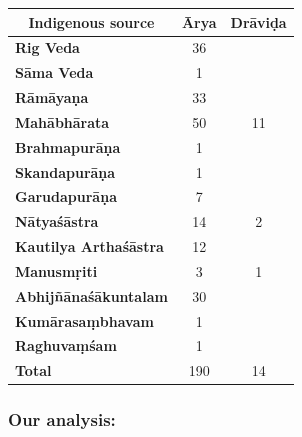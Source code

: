 \begin{table}[!htbp]
\caption{204 occurences of \textit{Ārya} and \textit{Drāviḍa} from 13 different sources}\label{art3-tab1}
\begin{longtable}{@{}|l|c|c|@{}}
\hline
\multicolumn{1}{|c|}{\textbf{Indigenous source}} & \multicolumn{1}{c|}{\textbf{Ārya}} & \multicolumn{1}{c|}{\textbf{Drāviḍa}} \\
\hline
\textbf{Rig Veda} & 36 &  \\
\hline
\textbf{Sāma Veda} & 1 &  \\
\hline
\textbf{Rāmāyaṇa} & 33 &  \\
\hline
\textbf{Mahābhārata} & 50 & 11 \\
\hline
\textbf{Brahmapurāṇa} & 1 &  \\
\hline
\textbf{Skandapurāṇa} & 1 &  \\
\hline
\textbf{Garudapurāṇa} & 7 &  \\
\hline
\textbf{Nātyaśāstra} & 14 & 2 \\
\hline
\textbf{Kautilya Arthaśāstra} & 12 &  \\
\hline
\textbf{Manusmṛiti} & 3 & 1 \\
\hline
\textbf{Abhijñānaśākuntalam} & 30 &  \\
\hline
\textbf{Kumārasaṃbhavam} & 1 &  \\
\hline
\textbf{Raghuvaṃśam} & 1 &  \\
\hline
\textbf{Total} & 190 & 14 \\
\hline
\end{longtable}
\end{table}


\subsubsection{Our analysis:}

